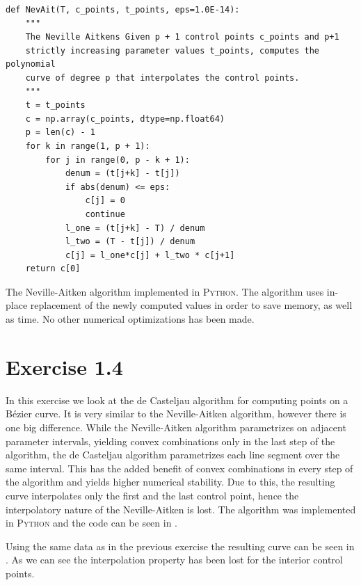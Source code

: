 \documentclass[a4paper]{article}
\begin{document}
    \begin{listing}
    \begin{verbatim}
def NevAit(T, c_points, t_points, eps=1.0E-14):
    """
    The Neville Aitkens Given p + 1 control points c_points and p+1
    strictly increasing parameter values t_points, computes the polynomial
    curve of degree p that interpolates the control points.
    """
    t = t_points
    c = np.array(c_points, dtype=np.float64)
    p = len(c) - 1
    for k in range(1, p + 1):
        for j in range(0, p - k + 1):
            denum = (t[j+k] - t[j]) 
            if abs(denum) <= eps:
                c[j] = 0
                continue
            l_one = (t[j+k] - T) / denum
            l_two = (T - t[j]) / denum
            c[j] = l_one*c[j] + l_two * c[j+1]
    return c[0]
    \end{verbatim}
    \caption{The Neville-Aitken algorithm implemented in \textsc{Python}. The
        algorithm uses in-place replacement of the newly computed values in
        order to save memory, as well as time. No other numerical optimizations
    has been made.}
    \label{lst:nev_ait}
    \end{listing}

    \section*{Exercise 1.4}
    \label{sec:exercise_1_4}
    
    In this exercise we look at the de Casteljau algorithm for computing points
    on a B\'ezier curve. It is very similar to the Neville-Aitken algorithm,
    however there is one big difference.  While the Neville-Aitken algorithm
    parametrizes on adjacent parameter intervals, yielding convex combinations
    only in the last step of the algorithm, the de Casteljau algorithm
    parametrizes each line segment over the same interval. This has the added
    benefit of convex combinations in every step of the algorithm and yields
    higher numerical stability. Due to this, the resulting curve interpolates
    only the first and the last control point, hence the interpolatory nature
    of the Neville-Aitken is lost. The algorithm was implemented in \textsc{Python}
    and the code can be seen in .

    Using the same data as in the previous exercise the resulting curve can be
    seen in . As we can see the interpolation property has
    been lost for the interior control points.
\end{document}
